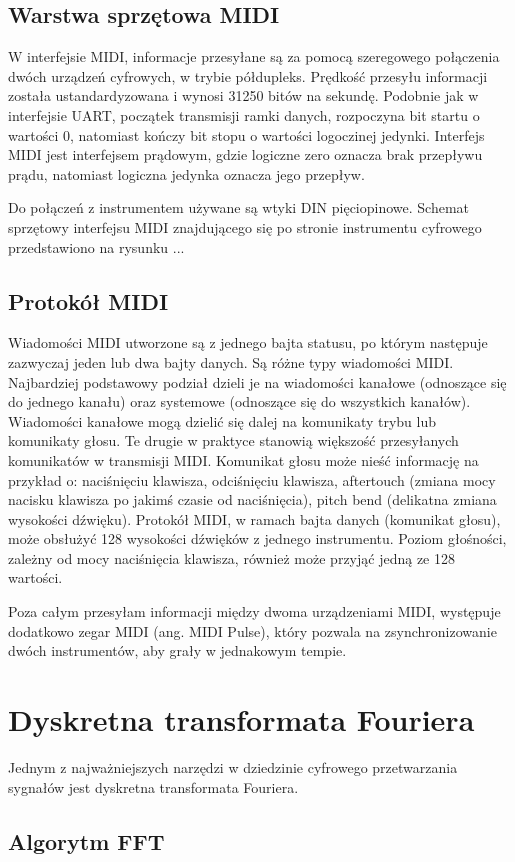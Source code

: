\subsection{Warstwa sprzętowa MIDI}
W interfejsie MIDI, informacje przesyłane są za pomocą szeregowego połączenia dwóch urządzeń cyfrowych, w trybie półdupleks. Prędkość przesyłu informacji została ustandardyzowana i wynosi 31250 bitów na sekundę. Podobnie jak w interfejsie UART, początek transmisji ramki danych, rozpoczyna bit startu o wartości 0, natomiast kończy bit stopu o wartości logoczinej jedynki. Interfejs MIDI jest interfejsem prądowym, gdzie logiczne zero oznacza brak przepływu prądu, natomiast logiczna jedynka oznacza jego przepływ.

Do połączeń z instrumentem używane są wtyki DIN pięciopinowe. Schemat sprzętowy interfejsu MIDI znajdującego się po stronie instrumentu cyfrowego przedstawiono na rysunku ...

\subsection{Protokół MIDI}
Wiadomości MIDI utworzone są z jednego bajta statusu, po którym następuje zazwyczaj jeden lub dwa bajty danych. Są różne typy wiadomości MIDI. Najbardziej podstawowy podział dzieli je na wiadomości kanałowe (odnoszące się do jednego kanału) oraz systemowe (odnoszące się do wszystkich kanałów). Wiadomości kanałowe mogą dzielić się dalej na komunikaty trybu lub komunikaty głosu. Te drugie w praktyce stanowią większość przesyłanych komunikatów w transmisji MIDI.
Komunikat głosu może nieść informację na przykład o: naciśnięciu klawisza, odciśnięciu klawisza, aftertouch (zmiana mocy nacisku klawisza po jakimś czasie od naciśnięcia), pitch bend (delikatna zmiana wysokości dźwięku). Protokół MIDI, w ramach bajta danych (komunikat głosu), może obsłużyć 128 wysokości dźwięków z jednego instrumentu. Poziom głośności, zależny od mocy naciśnięcia klawisza, również może przyjąć jedną ze 128 wartości.

Poza całym przesyłam informacji między dwoma urządzeniami MIDI, występuje dodatkowo zegar MIDI (ang. MIDI Pulse), który pozwala na zsynchronizowanie dwóch instrumentów, aby grały w jednakowym tempie.



\section{Dyskretna transformata Fouriera}
Jednym z najważniejszych narzędzi w dziedzinie cyfrowego przetwarzania sygnałów jest dyskretna transformata Fouriera.

\subsection{Algorytm FFT}
